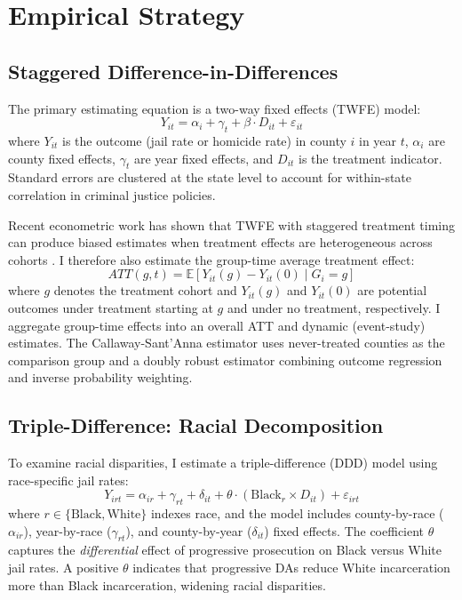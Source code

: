 \documentclass[12pt]{article}
\newcommand{\E}{\mathbb{E}}
\begin{document}
\section{Empirical Strategy}

\subsection{Staggered Difference-in-Differences}

The primary estimating equation is a two-way fixed effects (TWFE) model:
\begin{equation}
Y_{it} = \alpha_i + \gamma_t + \beta \cdot D_{it} + \varepsilon_{it}
\label{eq:twfe}
\end{equation}
where $Y_{it}$ is the outcome (jail rate or homicide rate) in county $i$ in year $t$, $\alpha_i$ are county fixed effects, $\gamma_t$ are year fixed effects, and $D_{it}$ is the treatment indicator. Standard errors are clustered at the state level to account for within-state correlation in criminal justice policies.

Recent econometric work has shown that TWFE with staggered treatment timing can produce biased estimates when treatment effects are heterogeneous across cohorts \citep{goodmanbacon2021did, dechaisemartin2020two, sunabraham2021}. I therefore also estimate the \citet{callaway2021did} group-time average treatment effect:
\begin{equation}
ATT(g,t) = \E\left[Y_{it}(g) - Y_{it}(0) \mid G_i = g\right]
\label{eq:csatt}
\end{equation}
where $g$ denotes the treatment cohort and $Y_{it}(g)$ and $Y_{it}(0)$ are potential outcomes under treatment starting at $g$ and under no treatment, respectively. I aggregate group-time effects into an overall ATT and dynamic (event-study) estimates. The Callaway-Sant'Anna estimator uses never-treated counties as the comparison group and a doubly robust estimator combining outcome regression and inverse probability weighting.

\subsection{Triple-Difference: Racial Decomposition}

To examine racial disparities, I estimate a triple-difference (DDD) model using race-specific jail rates:
\begin{equation}
Y_{irt} = \alpha_{ir} + \gamma_{rt} + \delta_{it} + \theta \cdot (\text{Black}_r \times D_{it}) + \varepsilon_{irt}
\label{eq:ddd}
\end{equation}
where $r \in \{\text{Black}, \text{White}\}$ indexes race, and the model includes county-by-race ($\alpha_{ir}$), year-by-race ($\gamma_{rt}$), and county-by-year ($\delta_{it}$) fixed effects. The coefficient $\theta$ captures the \textit{differential} effect of progressive prosecution on Black versus White jail rates. A positive $\theta$ indicates that progressive DAs reduce White incarceration more than Black incarceration, widening racial disparities.
\end{document}
